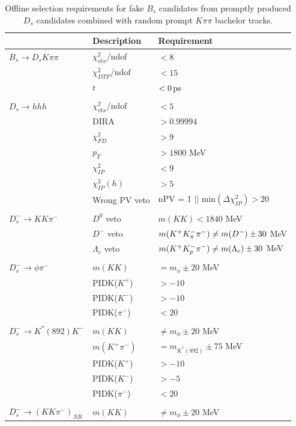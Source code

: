 \begin{table}[h]
\centering
\caption{Offline selection requirements for fake $B_s$ candidates from promptly produced $D_s$ candidates combined with random prompt $K\pi\pi$ bachelor tracks.}
 \renewcommand{\arraystretch}{1.0}
 \small
 \begin{tabular}{l l l}
\hline
\hline
 & Description & Requirement  \\
\hline
$B_s \to D_s K \pi \pi$  &  $\chi^{2}_{vtx}/\text{ndof}  $&$ <  8$ \\
&  $\chi^{2}_{DTF}/\text{ndof} $&$   <  15 $ \\
& $t$  & $< 0 {\mathrm{ \,ps}}$ \\
\\
$D_s \to h h h$ &  $\chi^{2}_{vtx}/\text{ndof}  $&$ <  5$  \\
& DIRA &$ > 0.99994$ \\
& $\chi^{2}_{FD}$ & $> 9$ \\
& $p_T$ & $> 1800$ MeV \\
& $\chi^{2}_{IP}$ & $< 9$ \\
&  $\chi^{2}_{IP}(h)$ &  $> 5$ \\
& Wrong PV veto & nPV = 1 $||$  $\text{min}(\Delta\chi^{2}_{IP}) > 20$ \\
\\
$D_s^- \to K K \pi^-$  & $D^0$ veto  & $m(K K) < 1840$ MeV \\
& $D^-$ veto  & $m({{K}^+} K^-_\pi {\ensuremath{{\pi}^-}}) \ne m(D^-) \pm 30$ MeV \\
& $\Lambda_c$ veto  & $m({{K}^+} K^-_p {{\pi}^-}) \ne m(\Lambda_c) \pm 30$ MeV \\
\\
$D_s^- \to \phi \pi^-$ & $m(KK)$  & $= m_{\phi} \pm 20$ MeV \\
& PIDK($K^+$) & $> -10$ \\
& PIDK($K^-$) & $> -10$ \\
& PIDK($\pi^-$) & $< 20$ \\
\\
$D_s^- \to K^{*}(892) K^-$ & $m(KK)$  & $\ne m_{\phi} \pm 20$ MeV \\
& $m(K^+\pi^-)$  & $= m_{K^{*}(892)} \pm 75$ MeV \\
& PIDK($K^+$) & $> -10$ \\
& PIDK($K^-$) & $> -5$ \\
& PIDK($\pi^-$) & $< 20$ \\
\\
$D_s^- \to (K K \pi^-)_{NR}$ & $m(KK)$  & $\ne m_{\phi} \pm 20$ MeV \\

\end{tabular}
\end{table}

